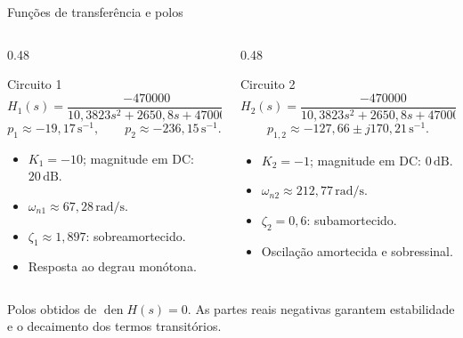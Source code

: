 \begin{frame}{Funções de transferência e polos}
  \small
  \begin{columns}[T,onlytextwidth]
    \begin{column}{0.48\textwidth}
      \begin{block}{Circuito 1}
        \[
          H_1(s)=\frac{-470000}
          {10{,}3823s^2+2650{,}8s+47000}
        \]
        \[
          p_1\approx-19{,}17\,\mathrm{s}^{-1},\qquad
          p_2\approx-236{,}15\,\mathrm{s}^{-1}.
        \]
        \begin{itemize}
          \item $K_1=-10$; magnitude em DC: $20\,\mathrm{dB}$.
          \item $\omega_{n1}\approx67{,}28\,\mathrm{rad/s}$.
          \item $\zeta_1\approx1{,}897$: sobreamortecido.
          \item Resposta ao degrau monótona.
        \end{itemize}
      \end{block}
    \end{column}
    \begin{column}{0.48\textwidth}
      \begin{block}{Circuito 2}
        \[
          H_2(s)=\frac{-470000}
          {10{,}3823s^2+2650{,}8s+470000}
        \]
        \[
          p_{1,2}\approx-127{,}66\pm j170{,}21\,\mathrm{s}^{-1}.
        \]
        \begin{itemize}
          \item $K_2=-1$; magnitude em DC: $0\,\mathrm{dB}$.
          \item $\omega_{n2}\approx212{,}77\,\mathrm{rad/s}$.
          \item $\zeta_2=0{,}6$: subamortecido.
          \item Oscilação amortecida e sobressinal.
        \end{itemize}
      \end{block}
    \end{column}
  \end{columns}

  \vspace{0.12cm}
  \centering\scriptsize
  Polos obtidos de $\operatorname{den}H(s)=0$.
  As partes reais negativas garantem estabilidade e o decaimento dos termos transitórios.
\end{frame}
